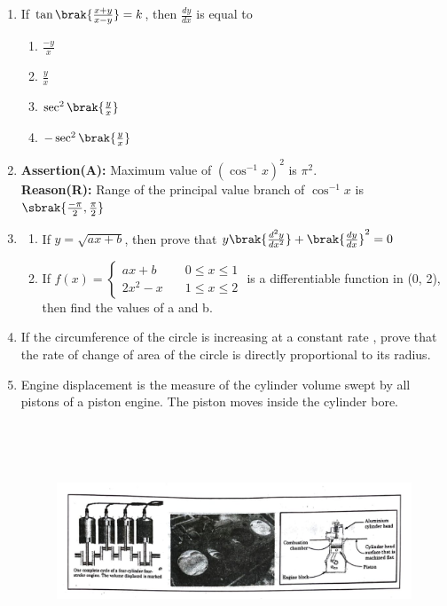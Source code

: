 \begin{enumerate}
  \item If $\tan\brak{\frac{x+y}{x-y}}=k$, then $\frac{dy}{dx}$ is equal to
    \begin{enumerate}
        \item $ \frac{-y}{x} $
        \item $  \frac{y}{x} $ 
        \item $ \sec^2\brak{\frac{y}{x}}$ 
        \item $ -\sec^2\brak{\frac{y}{x}} $  
    \end{enumerate}
    \item \textbf{Assertion(A):} Maximum value of $(\cos^{-1} x)^2$ is $\pi^2$.\\
    \textbf{Reason(R):} Range of the principal value branch of $\cos^{-1}x$ is $\sbrak{\frac{-\pi}{2},\frac{\pi}{2}}$
    \item \begin{enumerate}
                \item If $ y= \sqrt{ax + b} $, then prove that $y\brak{\frac{d^2y}{dx^2}} + \brak{\frac{dy}{dx}}^2 = 0$
              \item If $f(x) = 
              \begin{cases}
              ax + b & \quad  0 \le x \leq 1\\
              2x^2 - x & \quad 1 \le x \le 2
              \end{cases}$ is a differentiable function in (0, 2), then find the values of a and b.
        \end{enumerate}
\item If the circumference of the circle is increasing at a constant rate , prove that the rate of change of area of the circle is directly proportional to its radius.
 \item Engine displacement is the measure of the cylinder volume swept by all pistons of a piston engine. The piston moves inside the cylinder bore.
\begin{figure}[h!]
		\centering
		  \includegraphics[height=7cm,width=12cm]{./figs/q1.png}

\end{figure}
\end{enumerate}

